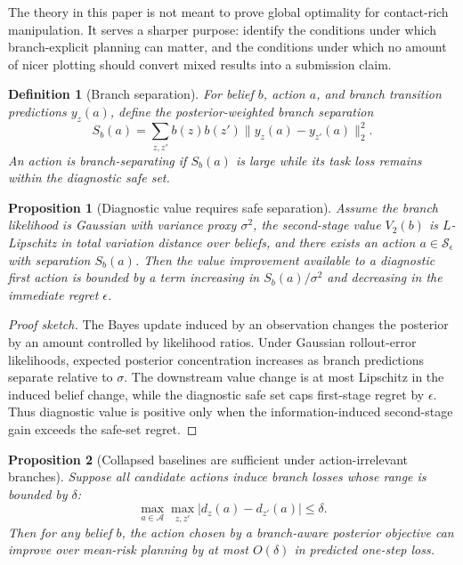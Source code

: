 \documentclass{article}
\newtheorem{definition}{Definition}
\newtheorem{proposition}{Proposition}
\newcommand{\latent}{z}
\newcommand{\act}{a}
\newcommand{\actionset}{\mathcal{A}}
\begin{document}
The theory in this paper is not meant to prove global optimality for contact-rich manipulation.  It serves a sharper purpose: identify the conditions under which branch-explicit planning can matter, and the conditions under which no amount of nicer plotting should convert mixed results into a submission claim.

\begin{definition}[Branch separation]
For belief $b$, action $\act$, and branch transition predictions $y_{\latent}(\act)$, define the posterior-weighted branch separation
\[
  S_b(\act)=
  \sum_{\latent,\latent'} b(\latent)b(\latent')
  \|y_{\latent}(\act)-y_{\latent'}(\act)\|_2^2.
\]
An action is branch-separating if $S_b(\act)$ is large while its task loss remains within the diagnostic safe set.
\end{definition}

\begin{proposition}[Diagnostic value requires safe separation]
Assume the branch likelihood is Gaussian with variance proxy $\sigma^2$, the second-stage value $V_2(b)$ is $L$-Lipschitz in total variation distance over beliefs, and there exists an action $\act \in \mathcal{S}_{\epsilon}$ with separation $S_b(\act)$.  Then the value improvement available to a diagnostic first action is bounded by a term increasing in $S_b(\act)/\sigma^2$ and decreasing in the immediate regret $\epsilon$.
\end{proposition}

\begin{proof}[Proof sketch]
The Bayes update induced by an observation changes the posterior by an amount controlled by likelihood ratios.  Under Gaussian rollout-error likelihoods, expected posterior concentration increases as branch predictions separate relative to $\sigma$.  The downstream value change is at most Lipschitz in the induced belief change, while the diagnostic safe set caps first-stage regret by $\epsilon$.  Thus diagnostic value is positive only when the information-induced second-stage gain exceeds the safe-set regret.
\end{proof}

\begin{proposition}[Collapsed baselines are sufficient under action-irrelevant branches]
Suppose all candidate actions induce branch losses whose range is bounded by $\delta$:
\[
  \max_{\act \in \actionset}\max_{\latent,\latent'}
  |d_{\latent}(\act)-d_{\latent'}(\act)| \le \delta.
\]
Then for any belief $b$, the action chosen by a branch-aware posterior objective can improve over mean-risk planning by at most $O(\delta)$ in predicted one-step loss.
\end{proposition}
\end{document}
